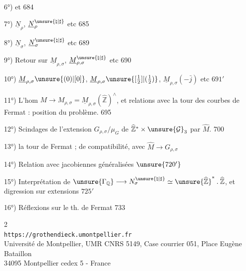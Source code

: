 6°)  
et
\hfill 684

7°) $\underline N_\rho$, $\underline N_\rho^{\unsure{\natural|\sharp}}$ etc \hfill 685

8°) $\underline N_\sigma$, $\underline N_\sigma^{\unsure{\natural|\sharp}}$ etc \hfill 689

9°) Retour sur $\underline M_{\rho,\sigma}$, $\underline M_{\rho,\sigma}^{\unsure{\natural|\sharp}}$ etc \hfill 690

10°) $\underline M_{\rho,\sigma}\unsure{(0)|[0]}$, $\underline M_{\rho,\sigma}\unsure{[\tfrac12]|(\tfrac12)}$, $\underline M_{\rho,\sigma}(-\bar j)$ etc \hfill $691'$

11°) L'hom $M\longrightarrow M_{\rho,\sigma}=\underline M_{\rho,\sigma}(\widehat{\mathbb Z})^{\wedge}$, et relations avec la tour des courbes de Fermat : position du problème. \hfill 695

12°) Scindages de l'extension $G_{\rho,\sigma}/\mu_G$ de $\widehat{\mathbb Z}^{*}\times\unsure{\mathcal G}_3$ par $\widehat M$. \hfill 700

13°)  la tour de Fermat ;   de compatibilité, avec $\widehat M\longrightarrow G_{\rho,\sigma}$ \hfill {}

14°) Relation avec jacobiennes généralisées \hfill $\unsure{720'}$

15°) Interprétation de $\unsure{\Gamma_{\mathbb Q}}\longrightarrow N_\sigma^{\unsure{\natural|\sharp}}\simeq\unsure{\widehat{\mathbb Z}}^{*}\mathbin{.}\widehat{\mathbb Z}$, et digression sur extensions  \hfill $725'$

16°) Réflexions sur le th. de Fermat \hfill 733


\begin{center}
\small
2\\
\texttt{https://grothendieck.umontpellier.fr}\\
Université de Montpellier, UMR CNRS 5149, Case courrier 051, Place Eugène Bataillon\\
34095 Montpellier cedex 5 - France
\end{center}

